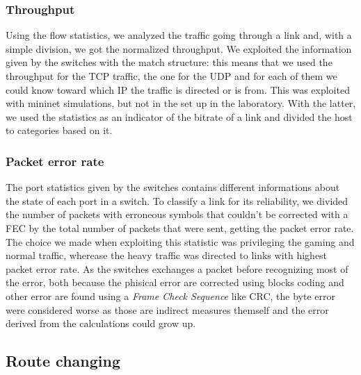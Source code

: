\documentclass[article,10pt]{IEEEtran}
\begin{document}
  \subsubsection{Throughput}

	Using the flow statistics, we analyzed the traffic going through a link and, with a simple division, we got the normalized throughput.
	We exploited the information given by the switches with the match structure: this means that we used the throughput for the TCP traffic,
	the one for the UDP and for each of them we could know toward which IP the traffic is directed or is from. This was exploited with mininet
	simulations, but not in the set up in the laboratory. With the latter, we used the statistics as an indicator of the bitrate of a link
	and divided the host to categories based on it.
\\
\subsubsection{Packet error rate}
The port statistics given by the switches contains different informations about the state of each port in a switch. To classify a link for its
reliability, we divided the number of packets with erroneous symbols that couldn't be corrected with a FEC by the total number of packets that were sent,
getting the packet error rate. The choice we made when exploiting this statistic was privileging the gaming and normal traffic, wherease the
heavy traffic was directed to links with highest packet error rate.  As the switches exchanges a packet before recognizing most of the error, both because the
phisical error are corrected using blocks coding and other error are found using a \textit{Frame Check Sequence} like CRC, the byte error were considered worse as
those are indirect measures themself and the error derived from the calculations could grow up.



\subsection{Route changing}
\end{document}

